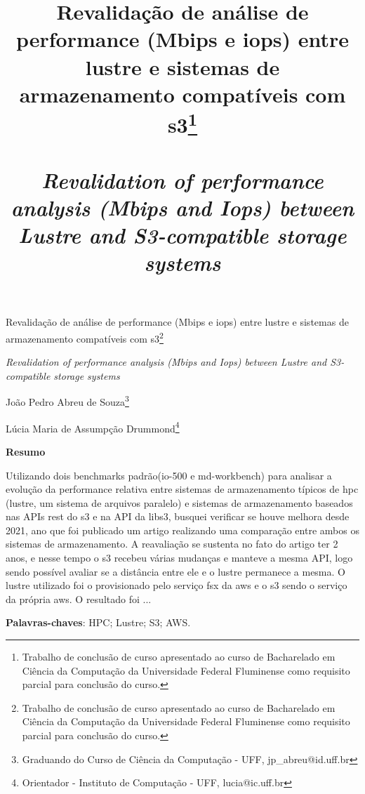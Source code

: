 \documentclass[article,a4paper,12pt,brazil,sumario=tradicional]{abntex2}
\title{ {\Large Revalidação de análise de performance (Mbips e iops) entre lustre e sistemas de armazenamento compatíveis com s3\footnote{Trabalho de conclusão de curso apresentado ao curso de Bacharelado em Ciência da Computação da Universidade Federal Fluminense como requisito parcial para conclusão do curso.}\\\\
\vspace{.2} 
\textit{Revalidation of performance analysis (Mbips and Iops) between Lustre and S3-compatible storage systems}\\}}
\date{ }
\begin{document}
\textual

\begin{center}
{\Large Revalidação de análise de performance (Mbips e iops) entre lustre e sistemas de armazenamento compatíveis com s3\footnote{Trabalho de conclusão de curso apresentado ao curso de Bacharelado em Ciência da Computação da Universidade Federal Fluminense como requisito parcial para conclusão do curso.}

\textit{Revalidation of performance analysis (Mbips and Iops) between Lustre and S3-compatible storage systems}\\}
\end{center}
\vspace{.2cm} 

\begin{flushright}
João Pedro Abreu de Souza\footnote{Graduando do Curso de Ciência da Computação - UFF, jp\_abreu@id.uff.br}

Lúcia Maria de Assumpção Drummond\footnote{Orientador - Instituto de Computação - UFF, lucia@ic.uff.br} 
\end{flushright}

\vspace{\onelineskip}

\begin{center}
    \textbf{Resumo}
\end{center}

\vspace{-.3cm}

\noindent Utilizando dois benchmarks padrão(io-500 e md-workbench) para analisar a evolução da performance relativa entre
sistemas de armazenamento típicos de hpc (lustre, um sistema de arquivos paralelo) e sistemas de armazenamento baseados
nas APIs rest do s3 e na API da libs3, busquei verificar se houve melhora desde 2021, ano que foi publicado um artigo realizando
uma comparação entre ambos os sistemas de armazenamento. A reavaliação se sustenta no fato do artigo ter 2 anos, e nesse
tempo o s3 recebeu várias mudanças e manteve a mesma API, logo sendo possível avaliar se a distância entre ele e o lustre
permanece a mesma. O lustre utilizado foi o provisionado pelo serviço fsx da aws e o s3 sendo o serviço da própria aws. O resultado foi ...

\vspace{.4cm}
 
\noindent
\textbf{Palavras-chaves}: HPC; Lustre; S3; AWS.
 
\vspace{\onelineskip}
\end{document}
